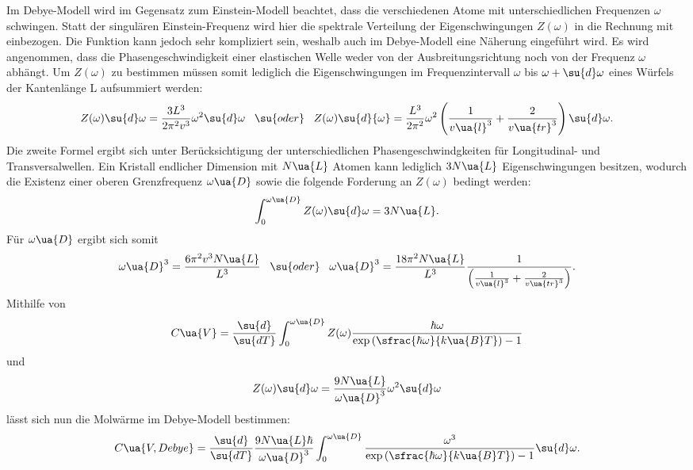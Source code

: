 Im Debye-Modell wird im Gegensatz zum Einstein-Modell beachtet, dass die verschiedenen
Atome mit unterschiedlichen Frequenzen $\omega$ schwingen. Statt der singulären
Einstein-Frequenz wird hier die spektrale Verteilung der Eigenschwingungen $Z(\omega)$
in die Rechnung mit einbezogen. Die Funktion kann jedoch sehr kompliziert sein,
weshalb auch im Debye-Modell eine Näherung eingeführt wird. Es wird angenommen,
dass die Phasengeschwindigkeit einer elastischen Welle weder von der Ausbreitungsrichtung
noch von der Frequenz $\omega$ abhängt. Um $Z(\omega)$ zu bestimmen müssen somit
lediglich die Eigenschwingungen im Frequenzintervall $\omega$ bis $\omega + \su{d}\omega$
eines Würfels der Kantenlänge L aufsummiert werden:
\begin{equation}
  Z(\omega)\su{d}\omega = \frac{3L^3}{2\pi^2v^3}\omega^2\su{d}\omega \,\,\,\,\, \su{oder} \,\,\,\,\,
  Z(\omega)\su{d}{\omega} = \frac{L^3}{2\pi^2}\omega^2\left( \frac{1}{v\ua{l}^3} + \frac{2}{v\ua{tr}^3}\right)\su{d}\omega.
\end{equation}
Die zweite Formel ergibt sich unter Berücksichtigung der unterschiedlichen Phasengeschwindgkeiten
für Longitudinal- und Transversalwellen.
Ein Kristall endlicher Dimension mit $N\ua{L}$ Atomen kann lediglich $3N\ua{L}$
Eigenschwingungen besitzen, wodurch die Existenz einer oberen Grenzfrequenz $\omega\ua{D}$
sowie die folgende Forderung an $Z(\omega)$ bedingt werden:
\begin{equation}
  \int_0^{\omega\ua{D}}Z(\omega)\su{d}\omega = 3N\ua{L}.
\end{equation}
Für $\omega\ua{D}$ ergibt sich somit
\begin{equation}
  \omega\ua{D}^3 = \frac{6\pi^2v^3N\ua{L}}{L^3} \,\,\,\,\, \su{oder} \,\,\,\,\,
  \omega\ua{D}^3 = \frac{18\pi^2N\ua{L}}{L^3} \frac{1}{\left(\frac{1}{v\ua{l}^3}+\frac{2}{v\ua{tr}^3}\right)}.
\end{equation}
Mithilfe von
\begin{equation}
  C\ua{V} = \frac{\su{d}}{\su{dT}} \int_0^{\omega\ua{D}} Z(\omega) \frac{\hbar\omega}{\exp{(\sfrac{\hbar\omega}{k\ua{B}T})}-1}
\end{equation}
und
\begin{equation}
  Z(\omega)\su{d}\omega = \frac{9N\ua{L}}{\omega\ua{D}^3}\omega^2 \su{d}\omega
\end{equation}
lässt sich nun die Molwärme im Debye-Modell bestimmen:
\begin{equation}
  C\ua{V, Debye} = \frac{\su{d}}{\su{dT}} \frac{9N\ua{L}\hbar}{\omega\ua{D}^3}\int_0^{\omega\ua{D}} \frac{\omega^3}{\exp{(\sfrac{\hbar\omega}{k\ua{B}T})}-1} \su{d}\omega.
\end{equation}
